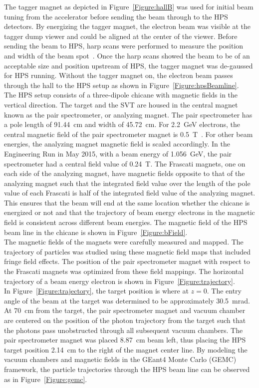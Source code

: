 The tagger magnet as depicted in Figure~\ref{Figure:hallB} was used for initial beam tuning from the accelerator before sending the beam through to the HPS detectors. By energizing the tagger magnet, the electron beam was visible at the tagger dump viewer and could be aligned at the center of the viewer. Before sending the beam to HPS, harp scans were performed to measure the position and width of the beam spot~\cite{beamline_nim_2017}. Once the harp scans showed the beam to be of an acceptable size and position upstream of HPS, the tagger magnet was de-gaussed for HPS running. Without the tagger magnet on, the electron beam passes through the hall to the HPS setup as shown in Figure~\ref{Figure:hpsBeamline}. \\
\indent The HPS setup consists of a three-dipole chicane with magnetic fields in the vertical direction. The target and the SVT are housed in the central magnet known as the pair spectrometer, or analyzing magnet. The pair spectrometer has a pole length of 91.44~cm and width of 45.72~cm. For 2.2~GeV electrons, the central magnetic field of the pair spectrometer magnet is 0.5~T~\cite{beamline_nim_2017}. For other beam energies, the analyzing magnet magnetic field is scaled accordingly. In the Engineering Run in May 2015, with a beam energy of 1.056~GeV, the pair spectrometer had a central field value of 0.24~T. The Frascati magnets, one on each side of the analyzing magnet, have magnetic fields opposite to that of the analyzing magnet such that the integrated field value over the length of the pole value of each Frascati is half of the integrated field value of the analyzing magnet. This ensures that the beam will end at the same location whether the chicane is energized or not and that the trajectory of beam energy electrons in the magnetic field is consistent across different beam energies. The magnetic field of the HPS beam line in the chicane is shown in Figure~\ref{Figure:bField}.\\
\indent The magnetic fields of the magnets were carefully measured and mapped. The trajectory of particles was studied using these magnetic field maps that included fringe field effects. The position of the pair spectrometer magnet with respect to the Frascati magnets was optimized from these field mappings. The horizontal trajectory of a beam energy electron is shown in Figure~\ref{Figure:trajectory}.\\
\indent In Figure~\ref{Figure:trajectory}, the target position is where at $z=0$. The entry angle of the beam at the target was determined to be approximately 30.5~mrad. At 70~cm from the target, the pair spectrometer magnet and vacuum chamber are centered on the position of the photon trajectory from the target such that the photons pass unobstructed through all subsequent vacuum chambers. The pair spectrometer magnet was placed 8.87~cm beam left, thus placing the HPS target position 2.14~cm to the right of the magnet center line. By modeling the vacuum chambers and magnetic fields in the GEant4 Monte Carlo (GEMC) framework, the particle trajectories through the HPS beam line can be observed as in Figure~\ref{Figure:gemc}.\\
